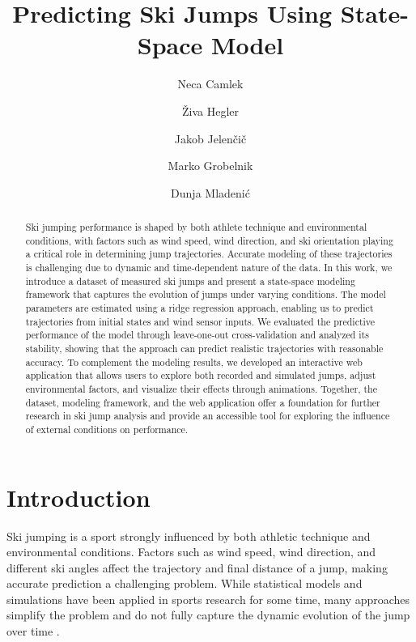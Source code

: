 \documentclass[sigconf]{acmart}
\title{Predicting Ski Jumps Using State-Space Model}
\author{Neca Camlek}
\affiliation{%
  \institution{Univerza v Ljubljani}
  \city{Ljubljana}
  \country{Slovenia}
}
\author{Živa Hegler}
\affiliation{%
  \institution{Univerza v Ljubljani}
  \city{Ljubljana}
  \country{Slovenia}
}
\author{Jakob Jelenčič}
\affiliation{%
  \institution{Jožef Stefan Institute}
  \city{Ljubljana}
  \country{Slovenia}
}
\author{Marko Grobelnik}
\affiliation{%
  \institution{Jožef Stefan Institute}
  \city{Ljubljana}
  \country{Slovenia}
}
\author{Dunja Mladenić}
\affiliation{%
  \institution{Jožef Stefan Institute}
  \city{Ljubljana}
  \country{Slovenia}
}
\begin{document}
\begin{abstract}
Ski jumping performance is shaped by both athlete technique and environmental
conditions, with factors such as wind speed, wind direction, and ski orientation
playing a critical role in determining jump trajectories. Accurate modeling of
these trajectories is challenging due to dynamic and time-dependent nature of
the data. In this work, we introduce a dataset of measured ski jumps and
present a state-space modeling framework that captures the evolution of jumps
under varying conditions. The model parameters are estimated using a ridge
regression approach, enabling us to predict trajectories from initial states and
wind sensor inputs. We evaluated the predictive performance of the model
through leave-one-out cross-validation and analyzed its stability, showing that
the approach can predict realistic trajectories with reasonable accuracy. To
complement the modeling results, we developed an interactive web application
that allows users to explore both recorded and simulated jumps, adjust
environmental factors, and visualize their effects through animations. Together,
the dataset, modeling framework, and the web application offer a foundation for
further research in ski jump analysis and provide an accessible tool for
exploring the influence of external conditions on performance.
\end{abstract}


\nocite{warehouse2025,aoki1990,bergmann2025,cai2021,mueller2008,mueller2006,plestenjak2016,posit2025,serrano2025,skijumphillarchive2025,thompson2025,vanwieringen2015,virmavirta2019,statquest2025}

\maketitle

\section{Introduction}
Ski jumping is a sport strongly influenced by both athletic technique and
environmental conditions. Factors such as wind speed, wind direction, and
different ski angles affect the trajectory and final distance of a jump, making
accurate prediction a challenging problem. While statistical models and
simulations have been applied in sports research for some time, many approaches
simplify the problem and do not fully capture the dynamic evolution of the jump
over time \cite{thompson2025}.
\end{document}
